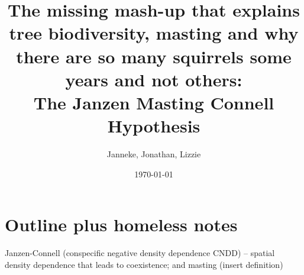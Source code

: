 \documentclass[11pt]{article}
\begin{document}

\renewcommand{\refname}{\CHead{}}

\setlength{\parindent}{0cm}
\setlength{\parskip}{5pt}

\title{The missing mash-up that explains tree biodiversity, masting and why there are so many squirrels some years and not others: \\ The Janzen Masting Connell Hypothesis}
\author{Janneke, Jonathan, Lizzie}
\date{\today}
\maketitle
\tableofcontents


\section{Outline plus homeless notes}

Janzen-Connell (conspecific negative density dependence CNDD) -- spatial density dependence that leads to coexistence; and masting (insert definition)
\end{document}
